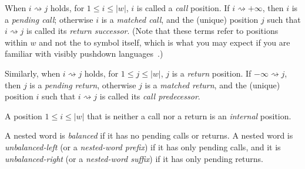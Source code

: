 When $i \rightsquigarrow j$ holds, for $1 \leq i \leq |w|$, $i$ is called a
\emph{call} position. If $i \rightsquigarrow +\infty$, then $i$ is a
\emph{pending call}; otherwise $i$ is a \emph{matched call}, and the
(unique) position $j$ such that $i \rightsquigarrow j$ is called its
\emph{return successor}. (Note that these terms refer to positions within
$w$ and not the to symbol itself, which is what you may expect if you are familiar with
visibly pushdown languages~\cite{JACM:AM2009}.)

Similarly, when $i \rightsquigarrow j$ holds, for $1 \leq j \leq |w|$, $j$
is a \emph{return} position. If $-\infty \rightsquigarrow j$, then $j$ is
a \emph{pending return}, otherwise $j$ is a \emph{matched return}, and
the (unique) position $i$ such that $i \rightsquigarrow j$ is called its
\emph{call predecessor}.

A position $1 \leq i \leq |w|$ that is neither a call nor a return is an
\emph{internal} position.

A nested word is \emph{balanced} if it has no pending calls
or returns.  A nested word is \emph{unbalanced-left} (or a
\emph{nested-word prefix}) if it has only pending calls, and it is
\emph{unbalanced-right} (or a \emph{nested-word suffix})
if it has only pending returns.



